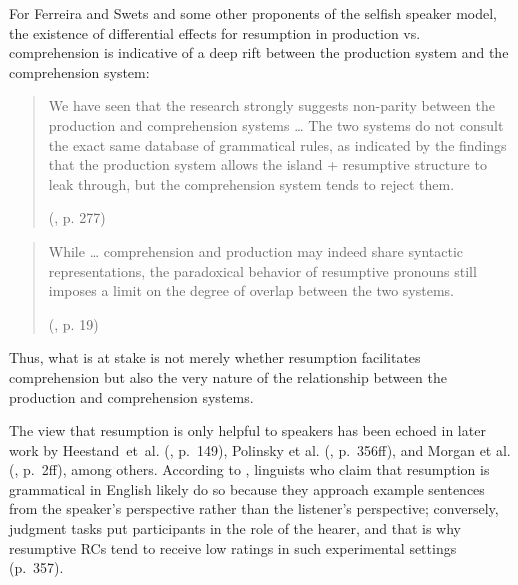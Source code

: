 For Ferreira and Swets and some other proponents of the selfish speaker model, the existence of differential effects for resumption in production vs. comprehension is indicative of a deep rift between the production system and the comprehension system:

\begin{samepage}\begin{quote}
We have seen that the research strongly suggests non-parity between the production and comprehension systems \dots{} The two systems do not consult the exact same database of grammatical rules, as indicated by the findings that the production system allows the island + resumptive structure to leak through, but the comprehension system tends to reject them. \par\nobreak\vspace{5pt}
\hfill (\cite{ferreira.swets2005}, p. 277)
\end{quote}\end{samepage}
\vspace{-6pt}

\begin{samepage}\begin{quote}
While \dots{} comprehension and production may indeed share syntactic representations, the paradoxical behavior of resumptive pronouns still imposes a limit on the degree of overlap between the two systems. \par\nobreak\vspace{5pt}
\hfill (\cite{morgan.etal2020}, p. 19)
\end{quote}\end{samepage}
\vspace{-6pt}

\noindent Thus, what is at stake is not merely whether resumption facilitates comprehension but also the very nature of the relationship between the production and comprehension systems. 

The view that resumption is only helpful to speakers has been echoed in later work by Heestand~et~al. (\citeyear{heestand.etal2011}, p.~149), Polinsky et al. (\citeyear{polinsky.etal2013}, p.~356ff), and Morgan et al. (\citeyear{morgan.etal2020}, p.~2ff), among others. According to \textcite{polinsky.etal2013}, linguists who claim that resumption is grammatical in English likely do so because they approach example sentences from the speaker's perspective rather than the listener's perspective; conversely, judgment tasks put participants in the role of the hearer, and that is why resumptive RCs tend to receive low ratings in such experimental settings (p.~357). 

